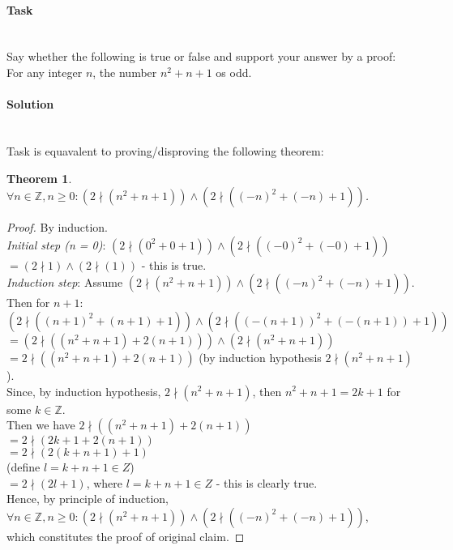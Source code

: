 \documentclass[11pt]{article}
\begin{document}
   \paragraph{Task}\mbox{} \\
      Say whether the following is true or false and support your answer by a proof: For any integer $n$, the number $n^{2} + n + 1$ os odd.
   \paragraph{Solution}\mbox{} \\
   Task is equavalent to proving/disproving the following theorem:
   \newtheorem*{Theorem}{Theorem}
   \begin{Theorem}
       $\forall n \in \mathbb{Z}, n \geq 0: \left(2 \nmid \left( n^{2} + n + 1 \right)\right) \land \left(2 \nmid \left( (-n)^{2} + (-n) + 1 \right)\right)$.
   \end{Theorem}
   \begin{proof}
   By induction. \\
   \emph{Initial step (n = 0)}: $\left(2 \nmid \left( 0^{2} + 0 + 1 \right)\right) \land \left(2 \nmid \left( (-0)^{2} + (-0) + 1 \right)\right)$ \\
   $= \left(2 \nmid 1\right) \land \left(2 \nmid \left( 1 \right)\right)$ - this is true. \\
   \emph{Induction step}: Assume $\left(2 \nmid \left( n^{2} + n + 1 \right)\right) \land \left(2 \nmid \left( (-n)^{2} + (-n) + 1 \right)\right)$.\\
   Then for $n + 1$:\\
   $\left(2 \nmid \left( (n + 1)^{2} + (n + 1) + 1 \right)\right) \land \left(2 \nmid \left( (-(n + 1))^{2} + (-(n + 1)) + 1 \right)\right)$ \\
   $= \left(2 \nmid \left(\left(n^{2} + n + 1\right) + 2\left(n + 1\right)\right)\right) \land \left(2 \nmid \left(n^{2} + n + 1\right)\right)$ \\
   $= 2 \nmid \left(\left(n^{2} + n + 1\right) + 2\left(n + 1\right)\right)$ (by induction hypothesis $2 \nmid \left( n^{2} + n + 1 \right)$).\\
   Since, by induction hypothesis, $2 \nmid \left( n^{2} + n + 1 \right)$, then $n^{2} + n + 1 = 2k + 1$ for some $k \in \mathbb{Z}$. \\
   Then we have $2 \nmid \left(\left(n^{2} + n + 1\right) + 2\left(n + 1\right)\right)$ \\
   $= 2 \nmid \left(2k + 1 + 2\left(n + 1\right)\right)$ \\
   $= 2 \nmid \left(2\left(k + n + 1\right) + 1\right)$  \\
   (define $l = k + n + 1 \in Z$) \\
   $= 2 \nmid \left(2l + 1\right)$, where $l = k + n + 1 \in Z$ - this is clearly true. \\
   Hence, by principle of induction, \\
   $\forall n \in \mathbb{Z}, n \geq 0: \left(2 \nmid \left( n^{2} + n + 1 \right)\right) \land \left(2 \nmid \left( (-n)^{2} + (-n) + 1 \right)\right)$, \\
   which constitutes the proof of original claim.
   \end{proof}
\end{document}
